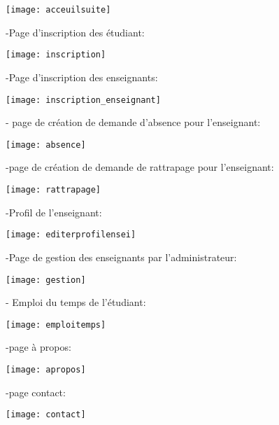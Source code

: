 \documentclass[a4paper,12pt,oneside]{report}
\begin{document}
\begin{center}
\texttt{[image: acceuilsuite]}

\label{fig1}
\end{center}
\newpage
-Page d'inscription des étudiant:
\begin{center}
\texttt{[image: inscription]}
\label{fig1}
\end{center}
-Page d'inscription des enseignants:
\begin{center}
\texttt{[image: inscription\_enseignant]}
\label{fig1}
\end{center} 
- page  de création de  demande d'absence pour l'enseignant:
\begin{center}
\texttt{[image: absence]}
\label{fig1}
\end{center}  
-page  de création de  demande de rattrapage pour l'enseignant:
\begin{center}
\texttt{[image: rattrapage]}

\label{fig1}
\end{center}
\newpage
-Profil de l'enseignant:
\begin{center}
\texttt{[image: editerprofilensei]}

\label{fig1}
\end{center}
-Page de gestion des enseignants par l'administrateur:
\begin{center}
\texttt{[image: gestion]}
\label{fig1}
\end{center}
\newpage
- Emploi du temps de l'étudiant:
\begin{center}
\texttt{[image: emploitemps]}
\label{fig1}
\end{center}
-page à propos:
\begin{center}
\texttt{[image: apropos]}

\label{fig1}
\end{center}
-page contact:
  \begin{center}
\texttt{[image: contact]}

\label{fig1}
\end{center}
\end{document}
